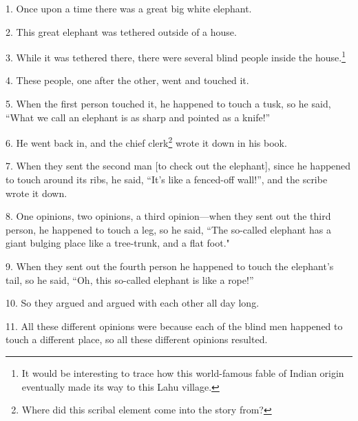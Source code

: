 \setcounter{footnote}{0}

1. Once upon a time there was a great big white elephant.

2. This great elephant was tethered outside of a house.

3. While it was tethered there, there were several blind people inside the house.\footnote{It would be interesting to trace how this world-famous fable of Indian origin eventually made its way to this Lahu village.}

4. These people, one after the other, went and touched it.

5. When the first person touched it, he happened to touch a tusk, so he said, ``What
we call an elephant is as sharp and pointed as a knife!''

6. He went back in, and the chief clerk\footnote{Where did this scribal element come into the story from?} wrote it down in his book.

7. When they sent the second man [to check out the elephant], since he happened
to touch around its ribs, he said, ``It's like a fenced-off wall!'', and the scribe
wrote it down.

8. One opinions, two opinions, a third opinion---when they sent out the third person,
he happened to touch a leg, so he said, ``The so-called elephant has a giant bulging
place like a tree-trunk, and a flat foot."

9. When they sent out the fourth person he happened to touch the elephant's tail,
so he said, ``Oh, this so-called elephant is like a rope!''

10. So they argued and argued with each other all day long.

11. All these different opinions were because each of the blind men happened to
touch a different place, so all these different opinions resulted.

